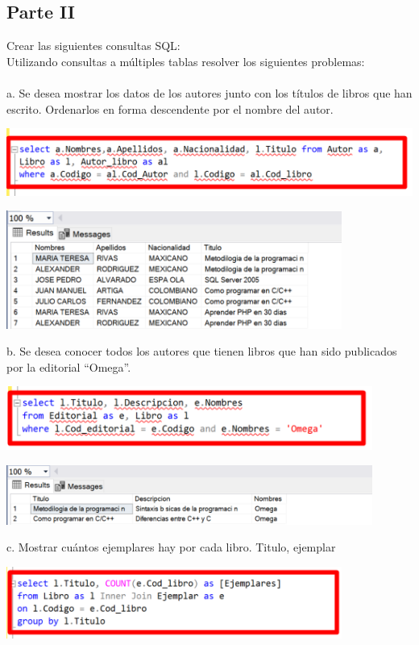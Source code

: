 \documentclass[12pt,letterpaper]{article}
\begin{document}
\subsection{Parte II}
Crear las siguientes consultas SQL:
\\Utilizando consultas a múltiples tablas resolver los siguientes problemas:
\\\\a. Se desea mostrar los datos de los autores junto con los títulos de libros que han escrito.
Ordenarlos en forma descendente por el nombre del autor.
\begin{center}
    \includegraphics[width=14cm]{img/8.png}  
\end{center}
\begin{center}
    \includegraphics[width=11cm]{img/9.png}  
\end{center}
b. Se desea conocer todos los autores que tienen libros que han sido publicados por la
editorial “Omega”.
\begin{center}
    \includegraphics[width=12cm]{img/10.png}  
\end{center}
\begin{center}
    \includegraphics[width=12cm]{img/11.png}  
\end{center}
c. Mostrar cuántos ejemplares hay por cada libro. Titulo, ejemplar
\begin{center}
    \includegraphics[width=11cm]{img/12.png}  
\end{center}
\end{document}
